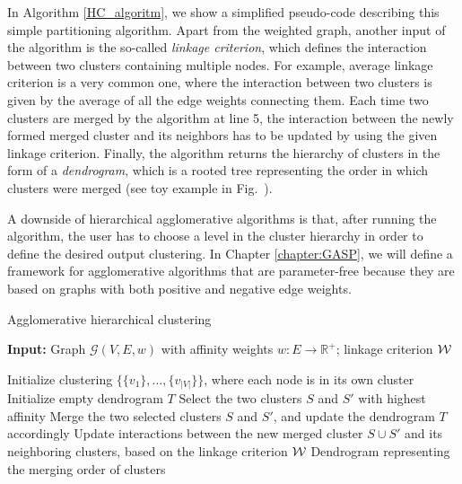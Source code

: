 In Algorithm \ref{HC_algoritm}, we show a simplified pseudo-code describing this simple partitioning algorithm. Apart from the weighted graph, another input of the algorithm is the so-called \emph{linkage criterion}, which defines the interaction between two clusters containing multiple nodes. For example, average linkage criterion is a very common one, where the interaction between two clusters is given by the average of all the edge weights connecting them. Each time two clusters are merged by the algorithm at line 5, the interaction between the newly formed merged cluster and its neighbors has to be updated by using the given linkage criterion. 
Finally, the algorithm returns the hierarchy of clusters in the form of a \emph{dendrogram}, which is a rooted tree representing the order in which clusters were merged (see toy example in Fig.~). 

A downside of hierarchical agglomerative algorithms is that, after running the algorithm, the user has to choose a level in the cluster hierarchy in order to define the desired output clustering. 
In Chapter \ref{chapter:GASP}, we will define a framework for agglomerative algorithms that are parameter-free because they are based on graphs with both positive and negative edge weights.

\begin{algorithm}[t]
\footnotesize
  \begin{flushleft}
  \footnotesize
  \caption{Agglomerative hierarchical clustering}
   \hspace*{\algorithmicindent} \textbf{Input:} Graph $\mathcal{G}(V,E,w)$ with affinity weights $w:E \rightarrow \mathbb{R}^+$; linkage criterion $\mathcal{W}{}$ \\
  \begin{algorithmic}[1]
  \footnotesize
      \State Initialize clustering $\{\{v_1\}, \ldots, \{v_{|V|}\}\}$, where each node is in its own cluster
      \State Initialize empty dendrogram $T$
      \Repeat 
        \State Select the two clusters $S$ and $S'$ with highest affinity
        \State Merge the two selected clusters $S$ and $S'$, and update the dendrogram $T$ accordingly
        \State Update interactions between the new merged cluster $S \cup S'$ and its neighboring clusters, based on the linkage criterion $\mathcal{W}{}$
      \State
      \Return Dendrogram representing the merging order of clusters
  \end{algorithmic}
    \label{HC_algoritm}
  \end{flushleft}

\end{algorithm}


